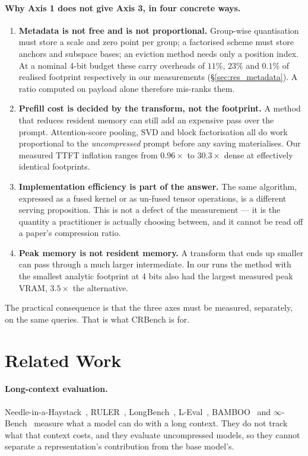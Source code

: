 \documentclass{article}
\theoremstyle{definition}
\begin{document}
\paragraph{Why Axis 1 does not give Axis 3, in four concrete ways.}
\begin{enumerate}[leftmargin=*,itemsep=2.0pt,topsep=3pt]
    \item \textbf{Metadata is not free and is not proportional.} Group-wise quantisation must store a scale and zero point per group; a factorised scheme must store anchors and subspace bases; an eviction method needs only a position index. At a nominal 4-bit budget these carry overheads of $11\%$, $23\%$ and $0.1\%$ of realised footprint respectively in our measurements (\S\ref{sec:res_metadata}). A ratio computed on payload alone therefore mis-ranks them.
    \item \textbf{Prefill cost is decided by the transform, not the footprint.} A method that reduces resident memory can still add an expensive pass over the prompt. Attention-score pooling, SVD and block factorisation all do work proportional to the \emph{uncompressed} prompt before any saving materialises. Our measured TTFT inflation ranges from $0.96\times$ to $30.3\times$ dense at effectively identical footprints.
    \item \textbf{Implementation efficiency is part of the answer.} The same algorithm, expressed as a fused kernel or as un-fused tensor operations, is a different serving proposition. This is not a defect of the measurement --- it is the quantity a practitioner is actually choosing between, and it cannot be read off a paper's compression ratio.
    \item \textbf{Peak memory is not resident memory.} A transform that ends up smaller can pass through a much larger intermediate. In our runs the method with the smallest analytic footprint at 4 bits also had the largest measured peak VRAM, $3.5\times$ the alternative.
\end{enumerate}

\noindent The practical consequence is that the three axes must be measured, separately, on the same queries. That is what CRBench is for.

\section{Related Work}
\label{sec:related}

\paragraph{Long-context evaluation.} Needle-in-a-Haystack~\citep{kamradt2023needle}, RULER~\citep{hsieh2024ruler}, LongBench~\citep{bai2023longbench,bai2024longbenchv2}, L-Eval~\citep{an2023leval}, BAMBOO~\citep{dong2023bamboo} and $\infty$-Bench~\citep{zhang2024infinitebench} measure what a model can do with a long context. They do not track what that context costs, and they evaluate uncompressed models, so they cannot separate a representation's contribution from the base model's.
\end{document}

